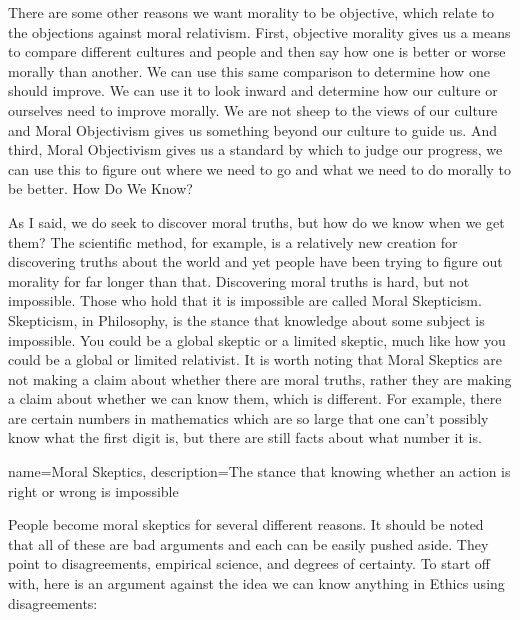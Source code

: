 There are some other reasons we want morality to be objective, which relate to the objections against moral relativism. First, objective morality gives us a means to compare different cultures and people and then say how one is better or worse morally than another. We can use this same comparison to determine how one should improve. We can use it to look inward and determine how our culture or ourselves need to improve morally. We are not sheep to the views of our culture and Moral Objectivism gives us something beyond our culture to guide us. And third, Moral Objectivism gives us a standard by which to judge our progress, we can use this to figure out where we need to go and what we need to do morally to be better.  
How Do We Know?

As I said, we do seek to discover moral truths, but how do we know when we get them? The scientific method, for example, is a relatively new creation for discovering truths about the world and yet people have been trying to figure out morality for far longer than that. Discovering moral truths is hard, but not impossible. Those who hold that it is impossible are called \gls{Moral Skepticism}. Skepticism, in Philosophy, is the stance that knowledge about some subject is impossible. You could be a global skeptic or a limited skeptic, much like how you could be a global or limited relativist. It is worth noting that Moral Skeptics are not making a claim about whether there are moral truths, rather they are making a claim about whether we can know them, which is different. For example, there are certain numbers in mathematics which are so large that one can't possibly know what the first digit is, but there are still facts about what number it is.

{
  name=Moral Skeptics,
  description={The stance that knowing whether an action is right or wrong is impossible}
}


People become moral skeptics for several different reasons. It should be noted that all of these are bad arguments and each can be easily pushed aside. They point to disagreements, empirical science, and degrees of certainty. To start off with, here is an argument against the idea we can know anything in Ethics using disagreements:


